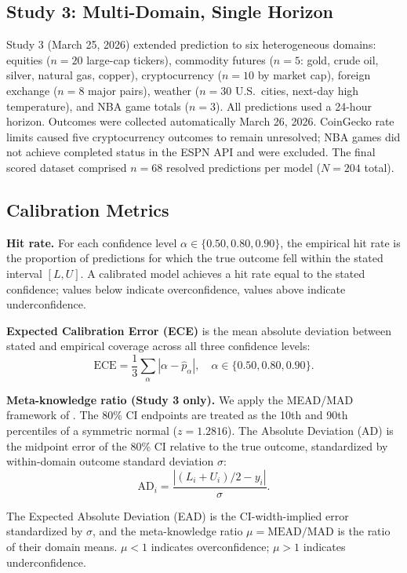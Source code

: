\subsection{Study 3: Multi-Domain, Single Horizon}
\label{sec:methods-study3}

Study 3 (March 25, 2026) extended prediction to six heterogeneous domains:
equities ($n = 20$ large-cap tickers), commodity futures ($n = 5$: gold, crude oil,
silver, natural gas, copper), cryptocurrency ($n = 10$ by market cap), foreign
exchange ($n = 8$ major pairs), weather ($n = 30$ U.S.\ cities, next-day high
temperature), and NBA game totals ($n = 3$). All predictions used a 24-hour
horizon. Outcomes were collected automatically March 26, 2026. CoinGecko rate
limits caused five cryptocurrency outcomes to remain unresolved; NBA games did
not achieve completed status in the ESPN API and were excluded. The final scored
dataset comprised $n = 68$ resolved predictions per model ($N = 204$ total).

\subsection{Calibration Metrics}
\label{sec:methods-metrics}

\textbf{Hit rate.} For each confidence level $\alpha \in \{0.50, 0.80, 0.90\}$,
the empirical hit rate is the proportion of predictions for which the true outcome
fell within the stated interval $[L, U]$. A calibrated model achieves a hit rate
equal to the stated confidence; values below indicate overconfidence, values above
indicate underconfidence.

\textbf{Expected Calibration Error (ECE)} is the mean absolute deviation between
stated and empirical coverage across all three confidence levels:
\begin{equation}
  \label{eq:ece}
  \text{ECE} = \frac{1}{3} \sum_{\alpha} \left| \alpha - \hat{p}_\alpha \right|,
  \quad \alpha \in \{0.50, 0.80, 0.90\}.
\end{equation}

\textbf{Meta-knowledge ratio (Study 3 only).} We apply the MEAD/MAD framework of
\citet{Soll2004}. The 80\% CI endpoints are treated as the 10th and 90th percentiles
of a symmetric normal ($z = 1.2816$). The Absolute Deviation (AD) is the midpoint
error of the 80\% CI relative to the true outcome, standardized by within-domain
outcome standard deviation $\sigma$:
\begin{equation}
  \label{eq:ad}
  \text{AD}_i = \frac{|(L_i + U_i)/2 - y_i|}{\sigma}.
\end{equation}

The Expected Absolute Deviation (EAD) is the CI-width-implied error standardized
by $\sigma$, and the meta-knowledge ratio $\mu = \text{MEAD}/\text{MAD}$ is the
ratio of their domain means. $\mu < 1$ indicates overconfidence; $\mu > 1$
indicates underconfidence.
